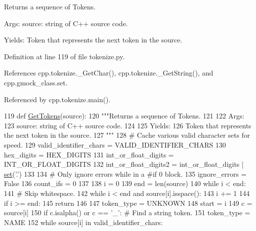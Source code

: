 \begin{DoxyVerb}Returns a sequence of Tokens.

Args:
  source: string of C++ source code.

Yields:
  Token that represents the next token in the source.
\end{DoxyVerb}
 

Definition at line 119 of file tokenize.\+py.



References cpp.\+tokenize.\+\_\+\+Get\+Char(), cpp.\+tokenize.\+\_\+\+Get\+String(), and cpp.\+gmock\+\_\+class.\+set.



Referenced by cpp.\+tokenize.\+main().


\begin{DoxyCode}
119 \textcolor{keyword}{def }\hyperlink{namespacecpp_1_1tokenize_ab78959b4d0a9c3bade98904a23129afc}{GetTokens}(source):
120     \textcolor{stringliteral}{"""Returns a sequence of Tokens.}
121 \textcolor{stringliteral}{}
122 \textcolor{stringliteral}{    Args:}
123 \textcolor{stringliteral}{      source: string of C++ source code.}
124 \textcolor{stringliteral}{}
125 \textcolor{stringliteral}{    Yields:}
126 \textcolor{stringliteral}{      Token that represents the next token in the source.}
127 \textcolor{stringliteral}{    """}
128     \textcolor{comment}{# Cache various valid character sets for speed.}
129     valid\_identifier\_chars = VALID\_IDENTIFIER\_CHARS
130     hex\_digits = HEX\_DIGITS
131     int\_or\_float\_digits = INT\_OR\_FLOAT\_DIGITS
132     int\_or\_float\_digits2 = int\_or\_float\_digits | \hyperlink{namespacecpp_1_1gmock__class_a2157e96eee0b4bf9ca6d195ab76f59c2}{set}(\textcolor{stringliteral}{'.'})
133 
134     \textcolor{comment}{# Only ignore errors while in a #if 0 block.}
135     ignore\_errors = \textcolor{keyword}{False}
136     count\_ifs = 0
137 
138     i = 0
139     end = len(source)
140     \textcolor{keywordflow}{while} i < end:
141         \textcolor{comment}{# Skip whitespace.}
142         \textcolor{keywordflow}{while} i < end \textcolor{keywordflow}{and} source[i].isspace():
143             i += 1
144         \textcolor{keywordflow}{if} i >= end:
145             \textcolor{keywordflow}{return}
146 
147         token\_type = UNKNOWN
148         start = i
149         c = source[i]
150         \textcolor{keywordflow}{if} c.isalpha() \textcolor{keywordflow}{or} c == \textcolor{stringliteral}{'\_'}:              \textcolor{comment}{# Find a string token.}
151             token\_type = NAME
152             \textcolor{keywordflow}{while} source[i] \textcolor{keywordflow}{in} valid\_identifier\_chars:

\end{DoxyCode}
